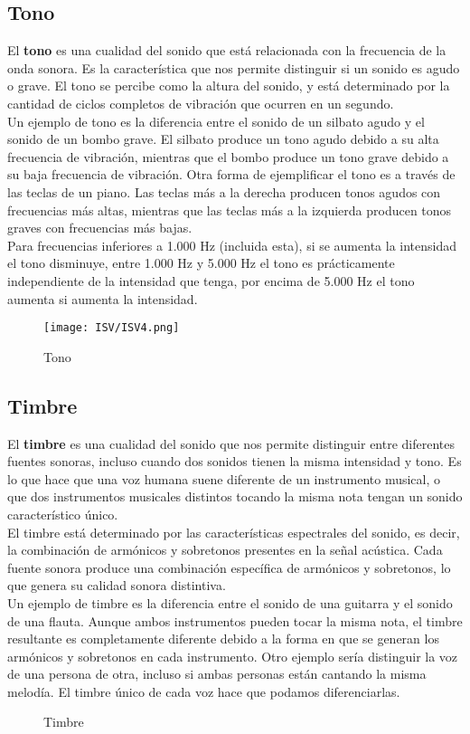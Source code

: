 \documentclass[
	12pt, %
	fleqn, %
	a4paper, %
	oneside, %
]{LegrandOrangeBook}
\begin{document}
\subsection{Tono}
El \textbf{tono} es una cualidad del sonido que está relacionada con la frecuencia de la onda sonora. Es la característica que nos permite distinguir si un sonido es agudo o grave. El tono se percibe como la altura del sonido, y está determinado por la cantidad de ciclos completos de vibración que ocurren en un segundo.\\
Un ejemplo de tono es la diferencia entre el sonido de un silbato agudo y el sonido de un bombo grave. El silbato produce un tono agudo debido a su alta frecuencia de vibración, mientras que el bombo produce un tono grave debido a su baja frecuencia de vibración. Otra forma de ejemplificar el tono es a través de las teclas de un piano. Las teclas más a la derecha producen tonos agudos con frecuencias más altas, mientras que las teclas más a la izquierda producen tonos graves con frecuencias más bajas.\\
Para frecuencias inferiores a 1.000 Hz (incluida esta), si se aumenta la intensidad el tono disminuye, entre 1.000 Hz y 5.000 Hz el tono es prácticamente independiente de la intensidad que tenga, por encima de 5.000 Hz el tono aumenta si aumenta la intensidad.
\begin{figure}[H]
\centering
\texttt{[image: ISV/ISV4.png]}
\caption{Tono}
\end{figure}
\subsection{Timbre}
El \textbf{timbre} es una cualidad del sonido que nos permite distinguir entre diferentes fuentes sonoras, incluso cuando dos sonidos tienen la misma intensidad y tono. Es lo que hace que una voz humana suene diferente de un instrumento musical, o que dos instrumentos musicales distintos tocando la misma nota tengan un sonido característico único.\\
El timbre está determinado por las características espectrales del sonido, es decir, la combinación de armónicos y sobretonos presentes en la señal acústica. Cada fuente sonora produce una combinación específica de armónicos y sobretonos, lo que genera su calidad sonora distintiva.\\
Un ejemplo de timbre es la diferencia entre el sonido de una guitarra y el sonido de una flauta. Aunque ambos instrumentos pueden tocar la misma nota, el timbre resultante es completamente diferente debido a la forma en que se generan los armónicos y sobretonos en cada instrumento. Otro ejemplo sería distinguir la voz de una persona de otra, incluso si ambas personas están cantando la misma melodía. El timbre único de cada voz hace que podamos diferenciarlas.
\begin{figure}[H]
\centering
{}
\caption{Timbre}
\end{figure}
\end{document}
